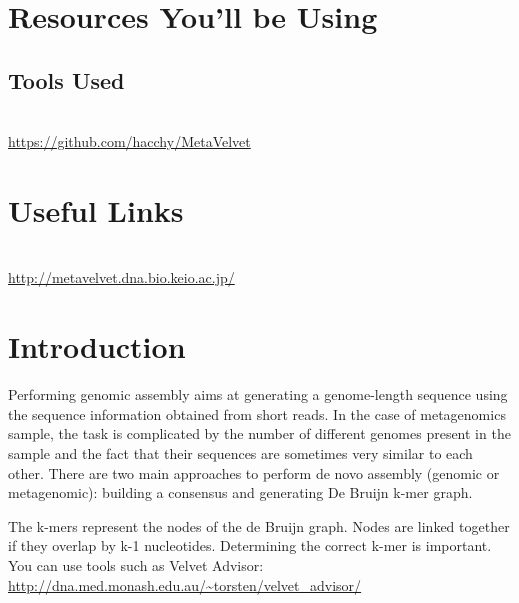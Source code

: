 \section{Resources You'll be Using}
 
\subsection{Tools Used}
\begin{description}[style=multiline,labelindent=0cm,align=left,leftmargin=0.5cm]
  \item[Meta-Velvet]\hfill\\
  	\url{https://github.com/hacchy/MetaVelvet}
\end{description}

\section{Useful Links}
 
\begin{description}[style=multiline,labelindent=0cm,align=left,leftmargin=0.5cm]
  \item[Meta-Velvet]\hfill\\
    \url{http://metavelvet.dna.bio.keio.ac.jp/}
\end{description}

\newpage

\section{Introduction}

\begin{note}
Performing genomic assembly aims at generating a genome-length sequence using the sequence information obtained from short reads. In the case of metagenomics sample, the task is complicated by the number of different genomes present in the sample and the fact that their sequences are sometimes very similar to each other. There are two main approaches to perform de novo assembly (genomic or metagenomic): building a consensus and generating De Bruijn k-mer graph. 
\end{note}

The k-mers represent the nodes of the de Bruijn graph. Nodes are linked together if they overlap by k-1 nucleotides. Determining the correct k-mer is important. You can use tools such as Velvet Advisor: \url{http://dna.med.monash.edu.au/~torsten/velvet_advisor/}

